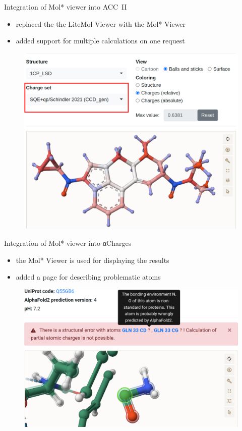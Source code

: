 \documentclass[
]{beamer}
\begin{document}
\begin{frame}{Integration of Mol* viewer into ACC~II}
  \begin{itemize}
    \item replaced the the LiteMol Viewer with the Mol* Viewer
    \item added support for multiple calculations on one request
  \end{itemize}
  \begin{figure}
    \includegraphics[width=1\textwidth,height=0.78\textheight,keepaspectratio]{images/acc2.png}
  \end{figure}
\end{frame}

\begin{frame}{Integration of Mol* viewer into αCharges}
  \begin{itemize}
    \item the Mol* Viewer is used for displaying the results
    \item added a page for describing problematic atoms
  \end{itemize}
  \begin{figure}
    \includegraphics[width=1\textwidth,height=0.75\textheight,keepaspectratio]{images/focus.png}
  \end{figure}
  \end{frame}
\end{document}
